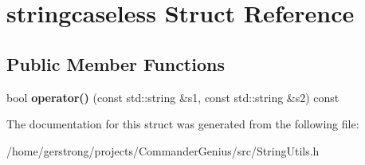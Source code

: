 \hypertarget{structstringcaseless}{
\section{stringcaseless Struct Reference}
\label{structstringcaseless}
}
\subsection*{Public Member Functions}
\begin{DoxyCompactItemize}
\item 
\hypertarget{structstringcaseless_a0a84c3287acb49a990dc7037111f58cb}{
bool {\bfseries operator()} (const std::string \&s1, const std::string \&s2) const }
\label{structstringcaseless_a0a84c3287acb49a990dc7037111f58cb}

\end{DoxyCompactItemize}


The documentation for this struct was generated from the following file:\begin{DoxyCompactItemize}
\item 
/home/gerstrong/projects/CommanderGenius/src/StringUtils.h\end{DoxyCompactItemize}
